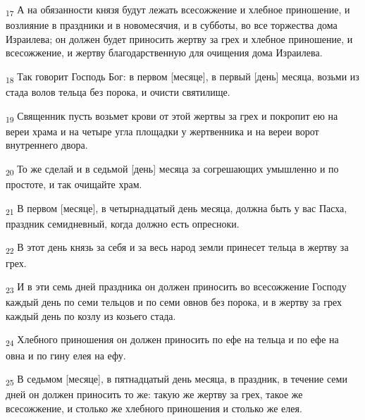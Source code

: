 \begin{tcolorbox}
\textsubscript{17} А на обязанности князя будут лежать всесожжение и хлебное приношение, и возлияние в праздники и в новомесячия, и в субботы, во все торжества дома Израилева; он должен будет приносить жертву за грех и хлебное приношение, и всесожжение, и жертву благодарственную для очищения дома Израилева.
\end{tcolorbox}
\begin{tcolorbox}
\textsubscript{18} Так говорит Господь Бог: в первом [месяце], в первый [день] месяца, возьми из стада волов тельца без порока, и очисти святилище.
\end{tcolorbox}
\begin{tcolorbox}
\textsubscript{19} Священник пусть возьмет крови от этой жертвы за грех и покропит ею на вереи храма и на четыре угла площадки у жертвенника и на вереи ворот внутреннего двора.
\end{tcolorbox}
\begin{tcolorbox}
\textsubscript{20} То же сделай и в седьмой [день] месяца за согрешающих умышленно и по простоте, и так очищайте храм.
\end{tcolorbox}
\begin{tcolorbox}
\textsubscript{21} В первом [месяце], в четырнадцатый день месяца, должна быть у вас Пасха, праздник семидневный, когда должно есть опресноки.
\end{tcolorbox}
\begin{tcolorbox}
\textsubscript{22} В этот день князь за себя и за весь народ земли принесет тельца в жертву за грех.
\end{tcolorbox}
\begin{tcolorbox}
\textsubscript{23} И в эти семь дней праздника он должен приносить во всесожжение Господу каждый день по семи тельцов и по семи овнов без порока, и в жертву за грех каждый день по козлу из козьего стада.
\end{tcolorbox}
\begin{tcolorbox}
\textsubscript{24} Хлебного приношения он должен приносить по ефе на тельца и по ефе на овна и по гину елея на ефу.
\end{tcolorbox}
\begin{tcolorbox}
\textsubscript{25} В седьмом [месяце], в пятнадцатый день месяца, в праздник, в течение семи дней он должен приносить то же: такую же жертву за грех, такое же всесожжение, и столько же хлебного приношения и столько же елея.
\end{tcolorbox}
